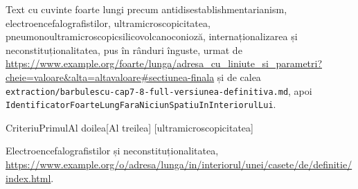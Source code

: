 \documentclass{texign-article}
\begin{document}
Text\cite{site} cu cuvinte foarte lungi precum antidisestablishmentarianism, electroencefalografistilor, ultramicroscopicitatea, pneumonoultramicroscopicsilicovolcanoconioză, internaționalizarea și neconstituționalitatea, pus în rânduri înguste, urmat de \url{https://www.example.org/foarte/lunga/adresa_cu_liniute_si_parametri?cheie=valoare&alta=altavaloare#sectiunea-finala} și de calea \texttt{extraction/barbulescu-cap7-8-full-versiunea-definitiva.md}, apoi \texttt{IdentificatorFoarteLungFaraNiciunSpatiuInInteriorulLui}.

\begin{comparison}{Criteriu}{Primul}{Al doilea}[Al treilea]
[ultramicroscopicitatea]
\end{comparison}

\begin{definition}[Internaționalizarea]
Electroencefalografistilor și neconstituționalitatea, \url{https://www.example.org/o/adresa/lunga/in/interiorul/unei/casete/de/definitie/index.html}.
\end{definition}

\printsources
\end{document}
